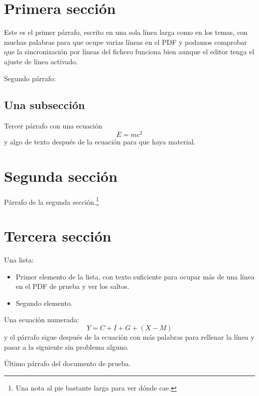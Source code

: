\documentclass[11pt]{article}
\begin{document}
\section{Primera sección}
Este es el primer párrafo, escrito en una sola línea larga como en los temas, con muchas palabras para que ocupe varias líneas en el PDF y podamos comprobar que la sincronización por líneas del fichero funciona bien aunque el editor tenga el ajuste de línea activado.

Segundo párrafo: \lipsum[1]

\subsection{Una subsección}
Tercer párrafo con una ecuación $$E = mc^2$$ y algo de texto después de la ecuación para que haya material.

\lipsum[2-6]

\section{Segunda sección}
Párrafo de la segunda sección.\footnote{Una nota al pie bastante larga para ver dónde cae.}

\lipsum[7-14]

\section{Tercera sección}
Una lista:
\begin{itemize}
  \item Primer elemento de la lista, con texto suficiente para ocupar más de una línea en el PDF de prueba y ver los saltos.
  \item Segundo elemento.
\end{itemize}

Una ecuación numerada:
\begin{equation}
  Y = C + I + G + (X - M)
\end{equation}
y el párrafo sigue después de la ecuación con más palabras para rellenar la línea y pasar a la siguiente sin problema alguno.

\lipsum[15-20]

Último párrafo del documento de prueba.
\end{document}

